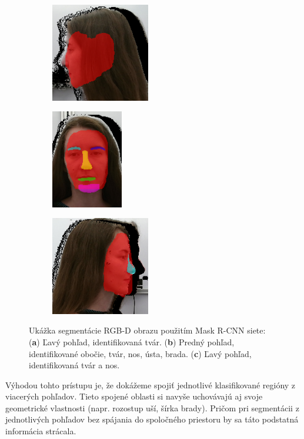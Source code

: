 \begin{figure}[H]
	\centering
	\begin{subfigure}[b]{0.32\textwidth}
		\centering
		\includegraphics[height=4.3cm]{figures/rcnn_detect1.png}
		\caption{}
		\label{fig:rcnn:label:a}
	\end{subfigure}
	\hskip 0.0in
	\begin{subfigure}[b]{0.32\textwidth}
		\centering
		\includegraphics[height=4.3cm]{figures/rcnn_detect2.png}
		\caption{}
		\label{fig:rcnn:label:b}
	\end{subfigure}
	\begin{subfigure}[b]{0.32\textwidth}
		\centering
		\includegraphics[height=4.3cm]{figures/rcnn_detect3.png}
		\caption{}
		\label{fig:rcnn:label:c}
	\end{subfigure}
	\caption{Ukážka segmentácie RGB-D obrazu použitím Mask R-CNN siete: (\textbf{a}) Ľavý pohľad, identifikovaná tvár. (\textbf{b}) Predný pohľad, identifikované obočie, tvár, nos, ústa, brada. (\textbf{c}) Ľavý pohľad, identifikovaná tvár a nos.}
	\label{fig:rcnn:label}
\end{figure}

Výhodou tohto prístupu je, že dokážeme spojiť jednotlivé klasifikované regióny z viacerých pohľadov. Tieto spojené oblasti si navyše uchovávajú aj svoje geometrické vlastnosti (napr. rozostup uší, šírka brady). Pričom pri segmentácii z jednotlivých pohľadov bez spájania do spoločného priestoru by sa táto podstatná informácia strácala. 

